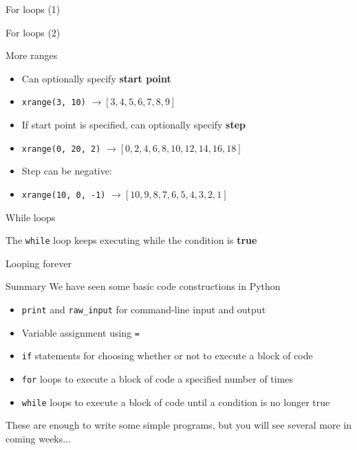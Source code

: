 \begin{frame}{For loops (1)}
	\socrative
\end{frame}

\begin{frame}{For loops (2)}
	\socrative
\end{frame}

\begin{frame}{More ranges}
	\begin{itemize}
		\pause\item Can optionally specify \textbf{start point}
		\pause\item \lstinline{xrange(3, 10)} $\to [3, 4, 5, 6, 7, 8, 9]$
		\pause\item If start point is specified, can optionally specify \textbf{step}
		\pause\item \lstinline{xrange(0, 20, 2)} $\to [0, 2, 4, 6, 8, 10, 12, 14, 16, 18]$
		\pause\item Step can be negative:
		\pause\item \lstinline{xrange(10, 0, -1)} $\to [10, 9, 8, 7, 6, 5, 4, 3, 2, 1]$
	\end{itemize}
\end{frame}

\begin{frame}{While loops}
	\socrative
	
	The \lstinline{while} loop keeps executing while the condition is \textbf{true}
	
\end{frame}

\begin{frame}{Looping forever}
	
\end{frame}

\begin{frame}{Summary}
	\pause We have seen some basic code constructions in Python
	\begin{itemize}
		\pause\item \lstinline{print} and \lstinline{raw_input} for command-line input and output
		\pause\item Variable assignment using \lstinline{=}
		\pause\item \lstinline{if} statements for choosing whether or not to execute a block of code
		\pause\item \lstinline{for} loops to execute a block of code a specified number of times
		\pause\item \lstinline{while} loops to execute a block of code until a condition is no longer true
	\end{itemize}
	\pause These are enough to write some simple programs, but you will see several more in coming weeks...
\end{frame}

